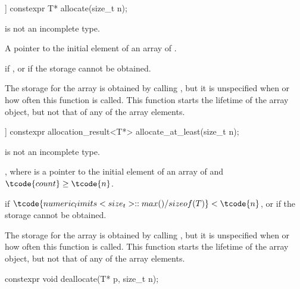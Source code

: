%
\begin{itemdecl}
[[nodiscard]] constexpr T* allocate(size_t n);
\end{itemdecl}

\begin{itemdescr}
\pnum
\mandates
{} is not an incomplete type.

\pnum
\returns
A pointer to the initial element of an array of  .

\pnum
\throws
{} if
, or
 if the storage cannot be obtained.

\pnum
\remarks
The storage for the array
is obtained by calling ,
but it is unspecified when or how often this
function is called.
This function starts the lifetime of the array object,
but not that of any of the array elements.
\end{itemdescr}

%
\begin{itemdecl}
[[nodiscard]] constexpr allocation_result<T*> allocate_at_least(size_t n);
\end{itemdecl}

\begin{itemdescr}
\pnum
\mandates
{} is not an incomplete type.

\pnum
\returns
{},
where  is a pointer to
the initial element of an array of   and
$\tcode{count} \geq \tcode{n}$.

\pnum
\throws
{}
if $\tcode{numeric_limits<size_t>::max() / sizeof(T)} < \tcode{n}$,
or  if the storage cannot be obtained.

\pnum
\remarks
The storage for the array is obtained by calling ,
but it is unspecified when or how often this function is called.
This function starts the lifetime of the array object,
but not that of any of the array elements.
\end{itemdescr}

%
\begin{itemdecl}
constexpr void deallocate(T* p, size_t n);
\end{itemdecl}

